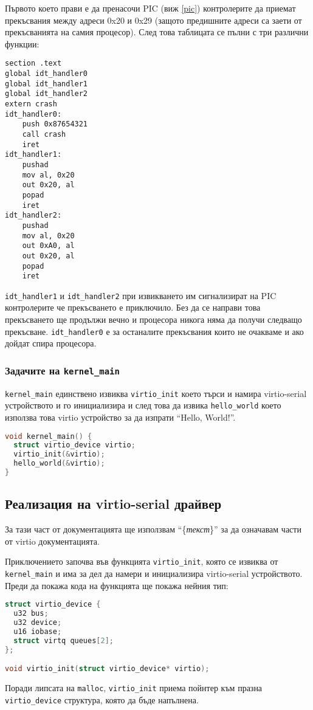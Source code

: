 Първото което прави е да пренасочи PIC (виж \ref{pic}) контролерите да приемат прекъсвания между адреси 0x20 и 0x29 (защото предишните адреси са заети от прекъсванията на самия процесор). След това таблицата се пълни с три различни функции:
\begin{lstlisting}
section .text
global idt_handler0
global idt_handler1
global idt_handler2
extern crash
idt_handler0:
    push 0x87654321
    call crash
    iret
idt_handler1:
    pushad
    mov al, 0x20
    out 0x20, al
    popad
    iret
idt_handler2:
    pushad
    mov al, 0x20
    out 0xA0, al
    out 0x20, al
    popad
    iret
\end{lstlisting}
{\tt idt\_handler1} и {\tt idt\_handler2} при извикването им сигнализират на PIC контролерите че прекъсването е приключило. Без да се направи това прекъсването ще продължи вечно и процесора никога няма да получи следващо прекъсване. {\tt idt\_handler0} е за останалите прекъсвания които не очакваме и ако дойдат спира процесора.

\subsubsection{Задачите на {\tt kernel\_main}}
{\tt kernel\_main} единствено извиква {\tt virtio\_init} което търси и намира virtio-serial устройството и го инициализира и след това да извика {\tt hello\_world} което използва това virtio устройство за да изпрати ``Hello, World!''.
\begin{lstlisting}[language=C]
void kernel_main() {
  struct virtio_device virtio;
  virtio_init(&virtio);
  hello_world(&virtio);
}
\end{lstlisting}

\subsection{Реализация на virtio-serial драйвер}
За тази част от документацията ще използвам ``\{\textit{текст}\}'' за да означавам части от virtio документацията.\parencite{virtiodocs}

Приключението започва във функцията {\tt virtio\_init}, която се извиква от {\tt kernel\_main} и има за дел да намери и инициализира virtio-serial устройството. Преди да покажа кода на функцията ще покажа нейния тип:
\begin{lstlisting}[language=C]
struct virtio_device {
  u32 bus;
  u32 device;
  u16 iobase;
  struct virtq queues[2];
};

void virtio_init(struct virtio_device* virtio);
\end{lstlisting}
Поради липсата на {\tt malloc}, {\tt virtio\_init} приема пойнтер към празна {\tt virtio\_device} структура, която да бъде напълнена.

